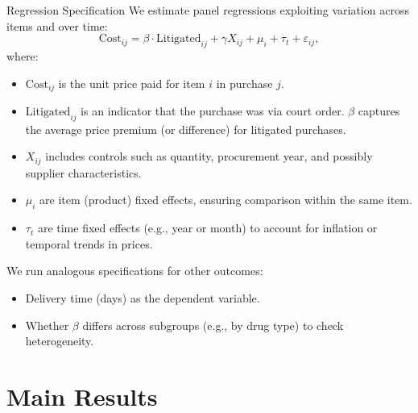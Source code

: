 \documentclass{beamer}
\begin{document}
\begin{frame}{Regression Specification}
We estimate panel regressions exploiting variation across items and over time:
\begin{equation*}
    \text{Cost}_{ij} = \beta \cdot \text{Litigated}_{ij} + \gamma X_{ij} + \mu_{i} + \tau_{t} + \varepsilon_{ij},
\end{equation*}
where:
\begin{itemize}\itemsep5pt
  \item $\text{Cost}_{ij}$ is the unit price paid for item $i$ in purchase $j$.
  \item $\text{Litigated}_{ij}$ is an indicator that the purchase was via court order. $\beta$ captures the average price premium (or difference) for litigated purchases.
  \item $X_{ij}$ includes controls such as quantity, procurement year, and possibly supplier characteristics.
  \item $\mu_{i}$ are item (product) fixed effects, ensuring comparison within the same item.
  \item $\tau_{t}$ are time fixed effects (e.g., year or month) to account for inflation or temporal trends in prices.
\end{itemize}
We run analogous specifications for other outcomes:
\begin{itemize}
  \item Delivery time (days) as the dependent variable.
  \item Whether $\beta$ differs across subgroups (e.g., by drug type) to check heterogeneity.
\end{itemize}
\end{frame}

\section{Main Results}
\end{document}
